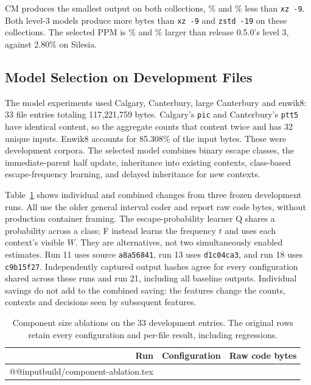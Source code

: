 \documentclass[10pt,letterpaper]{article}
\newcommand{\code}[1]{\texttt{#1}}
\begin{document}
CM produces the smallest output on both collections, \CensusCMSmallerXz\% and \BackblazeCMSmallerXz\% less than \mbox{\code{xz -9}}. Both level-3 models produce more bytes than \mbox{\code{xz -9}} and \mbox{\code{zstd -19}} on these collections. The selected PPM is \CensusPpmLargerPort\% and \BackblazePpmLargerPort\% larger than release 0.5.0's level 3, against 2.80\% on Silesia.

\subsection{Model Selection on Development Files}\label{sec:model-selection}
The model experiments used Calgary, Canterbury, large Canterbury and enwik8: 33 file entries totaling 117,221,759 bytes. Calgary's \code{pic} and Canterbury's \code{ptt5} have identical content, so the aggregate counts that content twice and has 32 unique inputs. Enwik8 accounts for 85.308\% of the input bytes. These were development corpora. The selected model combines binary escape classes, the immediate-parent half update, inheritance into existing contexts, class-based escape-frequency learning, and delayed inheritance for new contexts.

Table~\ref{tab:components} shows individual and combined changes from three frozen development runs. All use the older general interval coder and report raw code bytes, without production container framing. The escape-probability learner Q shares a probability across a class; F instead learns the frequency $t$ and uses each context's visible $W$. They are alternatives, not two simultaneously enabled estimates. Run 11 uses source \code{a8a56841}, run 13 uses \code{d1c04ca3}, and run 18 uses \code{c9b15f27}. Independently captured output hashes agree for every configuration shared across these runs and run 21, including all baseline outputs. Individual savings do not add to the combined saving: the features change the counts, contexts and decisions seen by subsequent features.

\begin{table}[htbp]
\centering
\caption{Component size ablations on the 33 development entries. The original rows retain every configuration and per-file result, including regressions.}\label{tab:components}
\medskip
\small
\begin{tabular}{@{}rlr@{}}
\toprule
Run & Configuration & Raw code bytes\\
\midrule
\csname @@input\endcsname build/component-ablation.tex
\bottomrule
\end{tabular}
\end{table}
\end{document}
